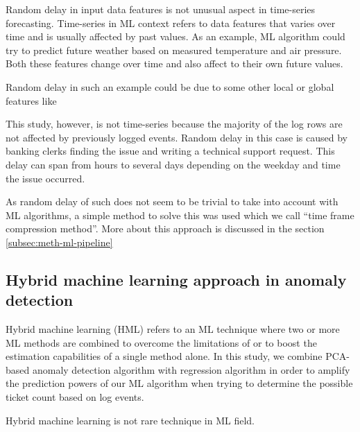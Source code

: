 Random delay in input data features
is not unusual aspect in time-series forecasting.
Time-series in ML context
refers to data features that varies over time
and is usually affected by past values.
As an example,
ML algorithm could try to predict future weather
based on measured temperature and air pressure.
Both these features change over time
and also affect to their own future values.

Random delay in such an example
could be due to some other local or global features
like

This study, however,
is not time-series
because the majority of the log rows
are not affected by previously logged events.
Random delay in this case
is caused by banking clerks
finding the issue and writing a technical support request.
This delay can span from hours to several days
depending on the weekday and time the issue occurred.


As random delay of such
does not seem to be trivial to take into account
with ML algorithms, %
a simple method to solve this was used
which we call \enquote{time frame compression method}.
More about this approach is discussed in the section \ref{subsec:meth-ml-pipeline}



\subsection{Hybrid machine learning approach in anomaly detection}\label{subsec:bg-hybrid-ml-approach-with-anomaly-detection}

Hybrid machine learning (HML)
refers to an ML technique
where two or more ML methods are combined
to overcome the limitations of
or to boost the estimation capabilities of
a single method alone.\cite{Anifowose2020hml}
In this study,
we combine PCA-based anomaly detection algorithm
with regression algorithm
in order to amplify the prediction powers of our ML algorithm
when trying to determine the possible ticket count
based on log events.

Hybrid machine learning is not rare technique in ML field.\cite{shon2007hybrid,tsai2010credit,mohan2019effective,
    hsieh2005hybrid,jain2007hybrid,kim2007hybrid,lee2002credit,malhotra2002differentiating}

